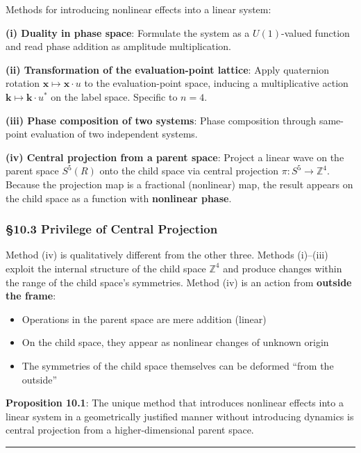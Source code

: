 \documentclass[
  a4paper,11pt]{article}
\providecommand{\tightlist}{%
  \setlength{\itemsep}{0pt}\setlength{\parskip}{0pt}}
\theoremstyle{definition}
\theoremstyle{remark}
\begin{document}
Methods for introducing nonlinear effects into a linear system:

\textbf{(i) Duality in phase space}: Formulate the system as a
\(U(1)\)-valued function and read phase addition as amplitude
multiplication.

\textbf{(ii) Transformation of the evaluation-point lattice}: Apply
quaternion rotation \(\mathbf{x} \mapsto \mathbf{x} \cdot u\) to the
evaluation-point space, inducing a multiplicative action
\(\mathbf{k} \mapsto \mathbf{k} \cdot u^*\) on the label space. Specific
to \(n = 4\).

\textbf{(iii) Phase composition of two systems}: Phase composition
through same-point evaluation of two independent systems.

\textbf{(iv) Central projection from a parent space}: Project a linear
wave on the parent space \(S^5(R)\) onto the child space via central
projection \(\pi : S^5 \to \mathbb{Z}^4\). Because the projection map is
a fractional (nonlinear) map, the result appears on the child space as a
function with \textbf{nonlinear phase}.

\subsubsection{§10.3 Privilege of Central
Projection}\label{privilege-of-central-projection}

Method (iv) is qualitatively different from the other three. Methods
(i)--(iii) exploit the internal structure of the child space
\(\mathbb{Z}^4\) and produce changes within the range of the child
space's symmetries. Method (iv) is an action from \textbf{outside the
frame}:

\begin{itemize}
\tightlist
\item
  Operations in the parent space are mere addition (linear)
\item
  On the child space, they appear as nonlinear changes of unknown origin
\item
  The symmetries of the child space themselves can be deformed ``from
  the outside''
\end{itemize}

\textbf{Proposition 10.1}: The unique method that introduces nonlinear
effects into a linear system in a geometrically justified manner without
introducing dynamics is central projection from a higher-dimensional
parent space.

\begin{center}\rule{0.5\linewidth}{0.5pt}\end{center}
\end{document}
